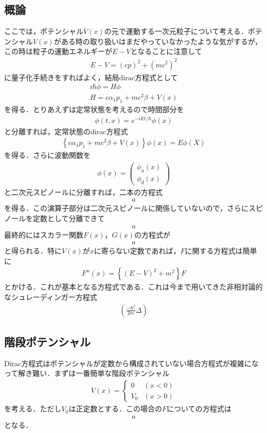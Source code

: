 \documentclass[a4j]{jarticle}
\begin{document}
\subsection{概論}
ここでは，ポテンシャル$V(x)$の元で運動する一次元粒子について考える．ポテンシャル$V(x)$がある時の取り扱いはまだやっていなかったような気がするが，この時は粒子の運動エネルギーが$E-V$となることに注意して
\begin{align*}
 E-V=(cp)^2+(mc^2)^2
\end{align*}
に量子化手続きをすればよく，結局dirac方程式として
\begin{align*}
 i\hbar \phi =H\phi\\
 H=c\alpha_1p_1+mc^2\beta +V(x)
\end{align*}
を得る．とりあえずは定常状態を考えるので時間部分を
\begin{align*}
 \phi(t,x)=e^{-iEt/\hbar}\phi (x)
\end{align*}
と分離すれば，定常状態のdirac方程式
\begin{align*}
 \left\{c\alpha_1p_1+mc^2\beta+V(x)\right\}\phi (x)=E\phi (X)
\end{align*}
を得る．さらに波動関数を
\begin{align*}
 \phi(x)=
 \begin{pmatrix}
  \phi_u(x)\\
  \phi_d(x)
 \end{pmatrix}
\end{align*}
と二次元スピノールに分離すれば，二本の方程式
\begin{align*}
 a
\end{align*}
を得る．この演算子部分は二次元スピノールに関係していないので，さらにスピノールを定数として分離できて
\begin{align*}
 a
\end{align*}
最終的にはスカラー関数$F(x)$，$G(x)$の方程式が
\begin{align*}
 a
\end{align*}
と得られる．特に$V(x)$が$x$に寄らない定数であれば，$F$に関する方程式は簡単に
\begin{align*}
 F''(x)=\left\{(E-V)^2+m^2\right\}F
\end{align*}
とかける．これが基本となる方程式である．これは今まで用いてきた非相対論的なシュレーディンガー方程式
\begin{align*}
 \left(\frac{-\hbar^2}{2m}\Delta\right)
\end{align*}


\subsection{階段ポテンシャル}
Dirac方程式はポテンシャルが定数から構成されていない場合方程式が複雑になって解き難い．まずは一番簡単な階段ポテンシャル
\begin{align*}
 V(x)=
 \begin{cases}
  0&(x<0)\\
  V_0&(x>0) 
 \end{cases}
\end{align*}
を考える．ただし$V_0$は正定数とする．この場合の$F$についての方程式は
\begin{align*}
 a
\end{align*}
となる．
\end{document}
